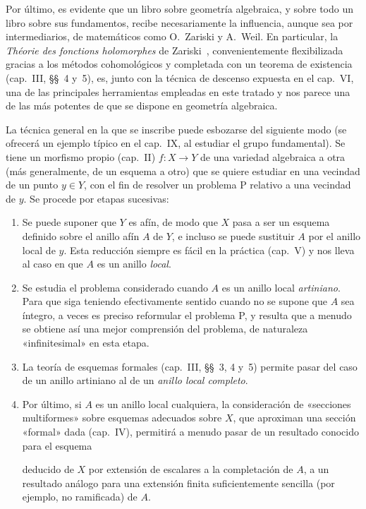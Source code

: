 Por último, es evidente que un libro sobre geometría algebraica, y sobre todo un libro sobre sus fundamentos, recibe necesariamente la influencia, aunque sea por intermediarios, de matemáticos como O.~Zariski y A.~Weil.
En particular, la \emph{Théorie des fonctions holomorphes} de Zariski~\cite{I-20}, convenientemente flexibilizada gracias a los métodos cohomológicos y completada con un teorema de existencia (cap.~III, \S\S~4 y~5), es, junto con la técnica de descenso expuesta en el cap.~VI, una de las principales herramientas empleadas en este tratado y nos parece una de las más potentes de que se dispone en geometría algebraica.

La técnica general en la que se inscribe puede esbozarse del siguiente modo (se ofrecerá un ejemplo típico en el cap.~IX, al estudiar el grupo fundamental).
Se tiene un morfismo propio (cap.~II) $f:X\to Y$ de una variedad algebraica a otra (más generalmente, de un esquema a otro) que se quiere estudiar en una vecindad de un punto $y\in Y$, con el fin de resolver un problema P relativo a una vecindad de $y$.
Se procede por etapas sucesivas:
\begin{enumerate}
  \item[$1^\circ$] Se puede suponer que $Y$ es afín, de modo que $X$ pasa a ser un esquema definido sobre el anillo afín $A$ de $Y$, e incluso se puede sustituir $A$ por el anillo local de $y$.
  Esta reducción siempre es fácil en la práctica (cap.~V) y nos lleva al caso en que $A$ es un anillo \emph{local}.
  \item[$2^\circ$] Se estudia el problema considerado cuando $A$ es un anillo local \emph{artiniano}.
  Para que siga teniendo efectivamente sentido cuando no se supone que $A$ sea íntegro, a veces es preciso reformular el problema P, y resulta que a menudo se obtiene así una mejor comprensión del problema, de naturaleza «infinitesimal» en esta etapa.
  \item[$3^\circ$] La teoría de esquemas formales (cap.~III, \S\S~3, 4 y~5) permite pasar del caso de un anillo artiniano al de un \emph{anillo local completo}.
  \item[$4^\circ$] Por último, si $A$ es un anillo local cualquiera, la consideración de «secciones multiformes» sobre esquemas adecuados sobre $X$, que aproximan una sección «formal» dada (cap.~IV), permitirá a menudo pasar de un resultado conocido para el esquema

  deducido de $X$ por extensión de escalares a la completación de $A$, a un resultado análogo para una extensión finita suficientemente sencilla (por ejemplo, no ramificada) de $A$.
\end{enumerate}

